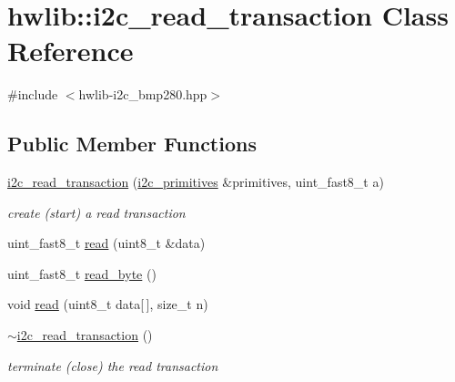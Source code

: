\hypertarget{classhwlib_1_1i2c__read__transaction}{}\section{hwlib\+::i2c\+\_\+read\+\_\+transaction Class Reference}
\label{classhwlib_1_1i2c__read__transaction}


{\ttfamily \#include $<$hwlib-\/i2c\+\_\+bmp280.\+hpp$>$}

\subsection*{Public Member Functions}
\begin{DoxyCompactItemize}
\item 
\mbox{\label{classhwlib_1_1i2c__read__transaction_ac88e81cebe07d775147379f080867550}} 
\mbox{\hyperlink{classhwlib_1_1i2c__read__transaction_ac88e81cebe07d775147379f080867550}{i2c\+\_\+read\+\_\+transaction}} (\mbox{\hyperlink{classhwlib_1_1i2c__primitives}{i2c\+\_\+primitives}} \&primitives, uint\+\_\+fast8\+\_\+t a)
\begin{DoxyCompactList}\small\item\em create (start) a read transaction \end{DoxyCompactList}\item 
uint\+\_\+fast8\+\_\+t \mbox{\hyperlink{classhwlib_1_1i2c__read__transaction_a624e7979dcf697e748955bace4cf2273}{read}} (uint8\+\_\+t \&data)
\item 
uint\+\_\+fast8\+\_\+t \mbox{\hyperlink{classhwlib_1_1i2c__read__transaction_a404a7d9db0ddd18aaeac84b266e89f9e}{read\+\_\+byte}} ()
\item 
void \mbox{\hyperlink{classhwlib_1_1i2c__read__transaction_a4c886112d92dddb502cb18a18c3a385f}{read}} (uint8\+\_\+t data\mbox{[}$\,$\mbox{]}, size\+\_\+t n)
\item 
\mbox{\label{classhwlib_1_1i2c__read__transaction_af1fab5e9582c503f62e257b3af739220}} 
\mbox{\hyperlink{classhwlib_1_1i2c__read__transaction_af1fab5e9582c503f62e257b3af739220}{$\sim$i2c\+\_\+read\+\_\+transaction}} ()
\begin{DoxyCompactList}\small\item\em terminate (close) the read transaction \end{DoxyCompactList}\end{DoxyCompactItemize}


